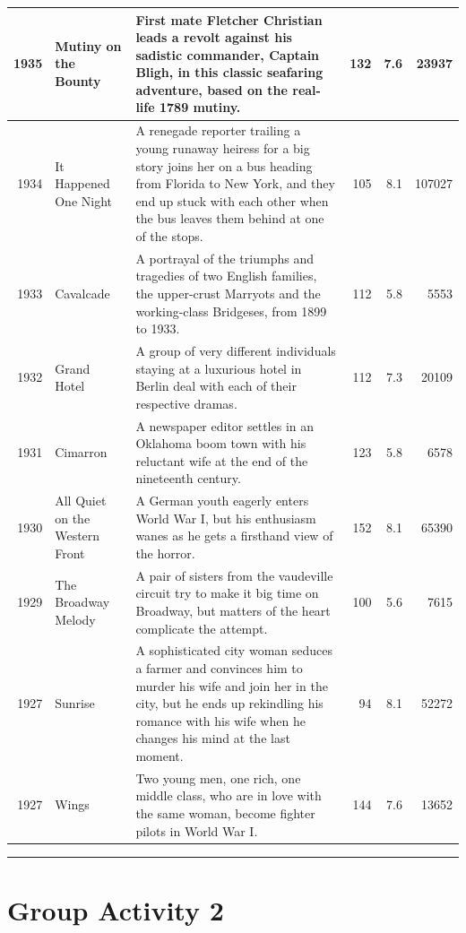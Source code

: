 \documentclass[
]{book}
\begin{document}
\begin{tabular}{r|l|l|r|r|r}
1935 & Mutiny on the Bounty & First mate Fletcher Christian leads a revolt against his sadistic commander, Captain Bligh, in this classic seafaring adventure, based on the real-life 1789 mutiny. & 132 & 7.6 & 23937\\
\hline
1934 & It Happened One Night & A renegade reporter trailing a young runaway heiress for a big story joins her on a bus heading from Florida to New York, and they end up stuck with each other when the bus leaves them behind at one of the stops. & 105 & 8.1 & 107027\\
\hline
1933 & Cavalcade & A portrayal of the triumphs and tragedies of two English families, the upper-crust Marryots and the working-class Bridgeses, from 1899 to 1933. & 112 & 5.8 & 5553\\
\hline
1932 & Grand Hotel & A group of very different individuals staying at a luxurious hotel in Berlin deal with each of their respective dramas. & 112 & 7.3 & 20109\\
\hline
1931 & Cimarron & A newspaper editor settles in an Oklahoma boom town with his reluctant wife at the end of the nineteenth century. & 123 & 5.8 & 6578\\
\hline
1930 & All Quiet on the Western Front & A German youth eagerly enters World War I, but his enthusiasm wanes as he gets a firsthand view of the horror. & 152 & 8.1 & 65390\\
\hline
1929 & The Broadway Melody & A pair of sisters from the vaudeville circuit try to make it big time on Broadway, but matters of the heart complicate the attempt. & 100 & 5.6 & 7615\\
\hline
1927 & Sunrise & A sophisticated city woman seduces a farmer and convinces him to murder his wife and join her in the city, but he ends up rekindling his romance with his wife when he changes his mind at the last moment. & 94 & 8.1 & 52272\\
\hline
1927 & Wings & Two young men, one rich, one middle class, who are in love with the same woman, become fighter pilots in World War I. & 144 & 7.6 & 13652\\
\hline
\end{tabular}

\begin{center}\rule{0.5\linewidth}{0.5pt}\end{center}

\hypertarget{group-activity-2-3}{%
\section{Group Activity 2}\label{group-activity-2-3}}
\end{document}
